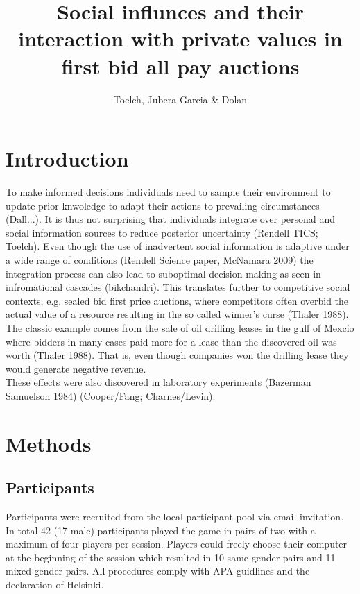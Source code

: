 \documentclass [man]{apa6}
\title{Social influnces and their interaction with private values in first bid all pay auctions  }
\date{}
\author{Toelch, Jubera-Garcia \& Dolan}
\begin{document}
\maketitle

\section{Introduction}
To make informed decisions individuals need to sample their environment to update prior knwoledge to adapt their actions to prevailing circumstances (Dall...). It is thus not surprising that individuals integrate over personal and social information sources to reduce posterior uncertainty (Rendell TICS; Toelch). Even though the use of inadvertent social information is adaptive under a wide range of conditions (Rendell Science paper, McNamara 2009) the integration process can also lead to suboptimal decision making as seen in infromational cascades (bikchandri).  This translates further to competitive social contexts, e.g. sealed bid first price auctions, where competitors often overbid the actual value of a resource resulting in the so called winner's curse (Thaler 1988). The classic example comes from the sale of oil drilling leases in the gulf of Mexcio where bidders in many cases paid more for a lease than the discovered oil was worth (Thaler 1988). That is, even though companies won the drilling lease they would generate negative revenue.\\
These effects were also discovered in laboratory experiments (Bazerman Samuelson 1984) (Cooper/Fang; Charnes/Levin).  



\section {Methods}
\subsection{Participants}
Participants were recruited from the local participant pool via email invitation. In total 42 (17 male) participants played the game in pairs of two with a maximum of four players per session. Players could freely choose their computer at the beginning of the session which resulted in 10 same gender pairs and 11 mixed gender pairs. All procedures comply with APA guidlines and the declaration of Helsinki. 
\end{document}
